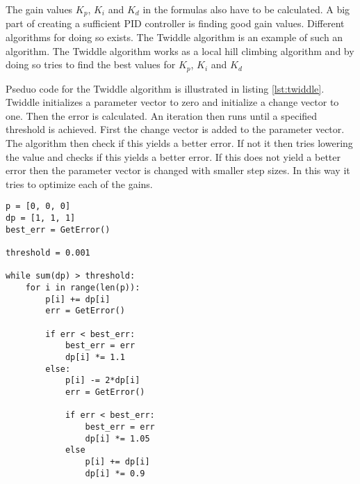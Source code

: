 
\FloatBarrier


The gain values $K_p$, $K_i$ and $K_d$ in the formulas also have to be calculated. A big part of creating a sufficient PID controller is finding good gain values. Different algorithms for doing so exists. The Twiddle algorithm is an example of such an algorithm. The Twiddle algorithm works as a local hill climbing algorithm and by doing so tries to find the best values for $K_p$, $K_i$ and $K_d$

Pseduo code for the Twiddle algorithm is illustrated in listing \ref{lst:twiddle}. Twiddle initializes a parameter vector to zero and initialize a change vector to one.  Then the error is calculated. An iteration then runs until a specified threshold is achieved. First the change vector is added to the parameter vector. The algorithm then check if this yields a better error. If not it then tries lowering the value and checks if this yields a better error. If this does not yield a better error then the parameter vector is changed with smaller step sizes.  In this way it tries to optimize each of the gains.

\newpage

\begin{lstlisting}[caption={Pseduo code for Twiddle}, label=lst:twiddle, mathescape=true]
p = [0, 0, 0]
dp = [1, 1, 1]
best_err = GetError()

threshold = 0.001

while sum(dp) > threshold:
	for i in range(len(p)):
		p[i] += dp[i]
		err = GetError()
		
		if err < best_err: 
			best_err = err
			dp[i] *= 1.1
		else: 
			p[i] -= 2*dp[i]
			err = GetError()
		
			if err < best_err:
				best_err = err
				dp[i] *= 1.05
			else 
				p[i] += dp[i]
				dp[i] *= 0.9
	\end{lstlisting}
\citep{feedbackSystem}